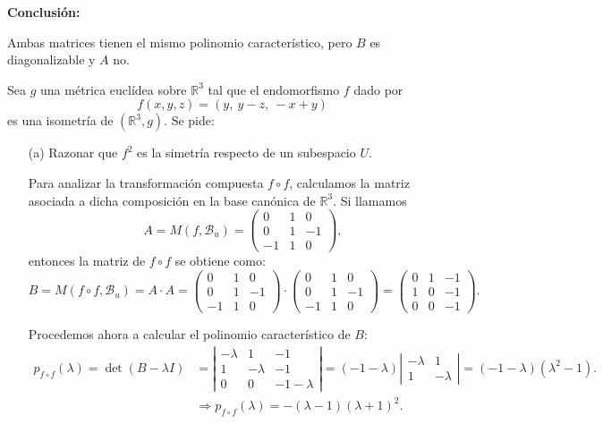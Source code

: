 \documentclass[12pt]{article}
\begin{document}
\begin{ejercicio}[2 puntos]
		\textbf{Conclusión:}
		
		Ambas matrices tienen el mismo polinomio característico, pero \( B \) es diagonalizable y \( A \) no.
	\end{ejercicio}
	
	\begin{ejercicio}[4 puntos]
		Sea $g$ una métrica euclídea sobre $\mathbb{R}^3$ tal que el endomorfismo $f$ dado por
		\[
		f(x, y, z) = (y,\ y - z,\ -x + y)
		\]
		es una isometría de $(\mathbb{R}^3, g)$. Se pide:
		\begin{enumerate}
			\item[(a)] Razonar que $f^2$ es la simetría respecto de un subespacio $U$.
			
					Para analizar la transformación compuesta \( f \circ f \), calculamos la matriz asociada a dicha composición en la base canónica de \( \mathbb{R}^3 \). Si llamamos
					\[
					A = M(f, \mathcal{B}_u) = \begin{pmatrix}
						0 & 1 & 0 \\
						0 & 1 & -1 \\
						-1 & 1 & 0
					\end{pmatrix},
					\]
					entonces la matriz de \( f \circ f \) se obtiene como:
					\[
					B = M(f \circ f, \mathcal{B}_u) = A \cdot A =
					\begin{pmatrix}
						0 & 1 & 0 \\
						0 & 1 & -1 \\
						-1 & 1 & 0
					\end{pmatrix}
					\cdot
					\begin{pmatrix}
						0 & 1 & 0 \\
						0 & 1 & -1 \\
						-1 & 1 & 0
					\end{pmatrix}
					=
					\begin{pmatrix}
						0 & 1 & -1 \\
						1 & 0 & -1 \\
						0 & 0 & -1
					\end{pmatrix}.
					\]
					
					\medskip
					
					Procedemos ahora a calcular el polinomio característico de \( B \):
					\begin{align*}
					p_{f \circ f}(\lambda) = \det(B - \lambda I) &=
					\left|
					\begin{array}{ccc}
						-\lambda & 1 & -1 \\
						1 & -\lambda & -1 \\
						0 & 0 & -1 - \lambda
					\end{array}
					\right|
					= (-1 - \lambda)
					\left|
					\begin{array}{cc}
						-\lambda & 1 \\
						1 & -\lambda
					\end{array}
					\right|
					= (-1 - \lambda)(\lambda^2 - 1).
					\\&\Longrightarrow p_{f \circ f}(\lambda) = -(\lambda - 1)(\lambda + 1)^2.
					\end{align*}
					

\end{enumerate}
\end{ejercicio}
\end{document}
